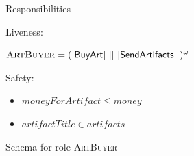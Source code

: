 \documentclass[paper=letter, fontsize=12pt]{article}
\begin{document}
\begin{figure}[H]
\begin{center}
{{%

\setlength\parindent{14pt} Responsibilities
\par \setlength\parindent{14pt} Liveness:
\par\setlength\parindent{75pt}$\text{\textsc{ArtBuyer}} = (\text{{\fontfamily{\sfdefault}\selectfont 
$[$BuyArt$]$ || $[$SendArtifacts$]$ }})^{\omega}$

\par \setlength\parindent{14pt} Safety:
\begin{itemize}[leftmargin=20mm]
\item $moneyForArtifact \leq money$
\item $artifactTitle \in artifacts$
\end{itemize}
    }%
}
\caption{Schema for role \textsc{ArtBuyer}}
\label{fig:role_art_buyer}
\end{center}
\end{figure}
\end{document}
